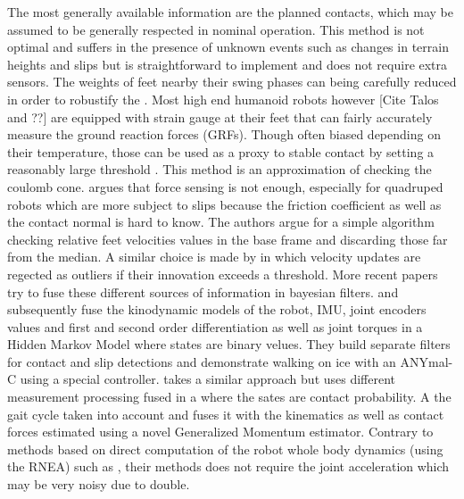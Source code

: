 The most generally available information are the planned contacts, which may be assumed to be generally respected in nominal operation. 
This method is not optimal and suffers in the presence of unknown events such as changes in terrain heights and slips but is straightforward to implement and 
does not require extra sensors. The weights of feet nearby their swing phases can being carefully reduced in order to robustify the \cite{leziart2021implementation, bledt2018contact}. 
Most high end humanoid robots however [Cite Talos and ??] are equipped with strain gauge at their feet that can fairly accurately measure the ground reaction forces (GRFs). 
Though often biased depending on their temperature, those can be used as a proxy to stable contact by setting a reasonably large threshold \cite{fallon2014drift}. 
This method is an approximation of checking the coulomb cone.
\cite{Focchi2015SlipDA} argues that force sensing is not enough, especially for quadruped robots which are more subject to slips because the friction coefficient
as well as the contact normal is hard to know. The authors argue for a simple algorithm checking relative feet velocities values in the base frame and discarding those
far from the median. A similar choice is made by \cite{bloesch2013stateSlippery} in which \KalmanF velocity updates are regected as outliers if their innovation exceeds a threshold.  
More recent papers try to fuse these different sources of information in bayesian filters. \cite{hwangbo2016probabilistic} and subsequently \cite{jenelten2019dynamic} fuse 
the kinodynamic models of the robot, IMU, joint encoders values and first and second order differentiation as well as
joint torques in a Hidden Markov Model where states are binary velues. They build separate filters for contact and slip detections and demonstrate walking on ice with an ANYmal-C using a special controller.
\cite{bledt2018contact} takes a similar approach but uses different measurement processing fused in a \KalmanF where the sates are contact probability. 
A the gait cycle taken into account and fuses it with the kinematics as well as contact forces estimated using a novel Generalized Momentum estimator. Contrary to methods 
based on direct computation of the robot whole body dynamics (using the RNEA) such as \cite{hwangbo2016probabilistic}, their methods does not require the joint acceleration which may be very noisy due to double.  

